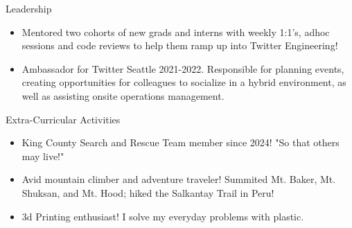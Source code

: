 \begin{rSection}{Leadership} 
    \begin{itemize}
        \item Mentored two cohorts of new grads and interns with weekly 1:1's, adhoc sessions and code reviews to help them ramp up into Twitter Engineering!
        \item Ambassador for Twitter Seattle 2021-2022. Responsible for planning events, creating opportunities for colleagues to socialize in a hybrid environment, as well as assisting onsite operations management.
    \end{itemize}
\end{rSection}
\begin{rSection}{Extra-Curricular Activities} 
    \begin{itemize}
        \item King County Search and Rescue Team member since 2024! "So that others may live!" 
        \item Avid mountain climber and adventure traveler! Summited Mt. Baker, Mt. Shuksan, and Mt. Hood; hiked the Salkantay Trail in Peru!
        \item 3d Printing enthusiast! I solve my everyday problems with plastic.
    \end{itemize}
\end{rSection}


